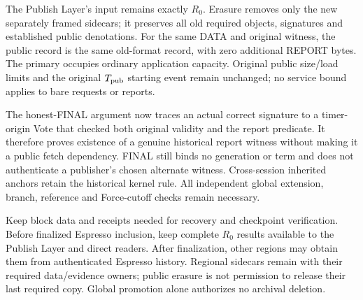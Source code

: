 The Publish Layer's input remains exactly $R_0$. Erasure removes only
the new separately framed sidecars; it preserves all old required
objects, signatures and established public denotations. For the same
DATA and original witness, the public record is the same old-format
record, with zero additional REPORT bytes. The primary occupies ordinary
application capacity. Original public size/load limits and the original
$T_{\rm pub}$ starting event remain unchanged; no service bound applies
to bare requests or reports.

The honest-FINAL argument now traces an actual correct signature to a
timer-origin Vote that checked both original validity and the report
predicate. It therefore proves existence of a genuine historical
report witness without making it a public fetch dependency. FINAL still
binds no generation or term and does not authenticate a publisher's
chosen alternate witness. Cross-session inherited anchors retain the
historical kernel rule. All independent global extension, branch,
reference and Force-cutoff checks remain necessary.

Keep block data and receipts needed for recovery and checkpoint
verification. Before finalized Espresso inclusion, keep complete $R_0$
results available to the Publish Layer and direct readers. After
finalization, other regions may obtain them from authenticated Espresso
history. Regional sidecars remain with their required data/evidence
owners; public erasure is not permission to release their last required
copy. Global promotion alone authorizes no archival deletion.

